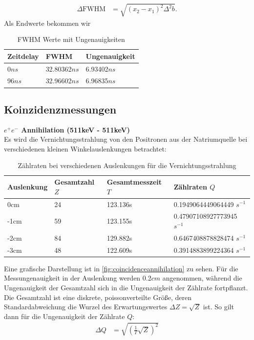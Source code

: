 \documentclass[%
aps,
onecolumn,
11pt,
tightenlines,
nofootinbib,
superscriptaddress,
floatfix,
prd,
]{revtex4-2}
\begin{document}
\begin{align}
	\Delta \text{FWHM} &= \sqrt{ (x_2 - x_1)^2\Delta^2 b }.
\end{align}
Als Endwerte bekommen wir
\begin{table}[H]
	\centering
	\begin{tabular}{lll}
		\toprule
			Zeitdelay & FWHM         & Ungenauigkeit \\
		\midrule
			0$ns$     & 32.80362$ns$ & 6.93402$ns$ \\
		\cline{1-3}
			96$ns$    & 32.96602$ns$ & 6.96835$ns$ \\
		\cline{1-3}
		\bottomrule
	\end{tabular}
	\caption{FWHM Werte mit Ungenauigkeiten}
	\label{tab:fwhm}
\end{table}

\newpage
\subsection{Koinzidenzmessungen}
\noindent \textbf{$e^+e^-$ Annihilation (511keV - 511keV)}\\
	Es wird die Vernichtungsstrahlung von den Positronen aus der Natriumquelle bei verschiedenen kleinen Winkelauslenkungen betrachtet:

\begin{table}[H]
    \centering
    \begin{tabular}{llll}
    \hline
        Auslenkung & Gesamtzahl $Z$ & Gesamtmesszeit $T$ & Zählraten $Q$\\ \hline
        0cm & 24 & 123.136s & 0.1949064449064449 $s^{-1}$ \\ \hline
        -1cm & 59 & 123.155s & 0.47907108927773945 $s^{-1}$ \\ \hline
        -2cm & 84 & 129.882s & 0.6467408878828474 $s^{-1}$ \\ \hline
        -3cm & 48 & 122.609s & 0.3914883899224364 $s^{-1}$ \\ \hline
    \end{tabular}
	\caption{Zählraten bei verschiedenen Auslenkungen für die Vernichtungsstrahlung}
	\label{tab:coincidenceannihilation}
\end{table}

Eine grafische Darstellung ist in \ref{fig:coincidenceannihilation} zu sehen. Für die Messungenauigkeit in der Auslenkung werden 0.2$cm$ angenommen, während die Ungenauigkeit der Gesamtzahl sich in die Ungenauigkeit der Zählrate fortpflanzt. Die Gesamtzahl ist eine diskrete, poissonverteilte Größe, deren Standardabweichung die Wurzel des Erwartungswertes $\Delta Z = \sqrt{Z}$ ist. So gilt dann für die Ungenauigkeit der Zählrate $Q$:
\begin{align}
	\Delta Q &= \sqrt{ \left( \frac{1}{T}\sqrt{Z}  \right)^2  }
\end{align}
\end{document}
